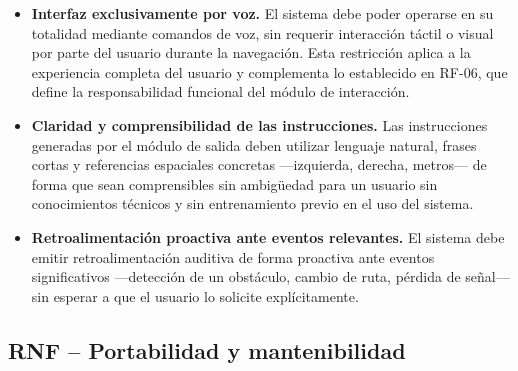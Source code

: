 \begin{itemize}

    \item[\textbf{RNF-10}] \textbf{Interfaz exclusivamente por voz.}
    El sistema debe poder operarse en su totalidad mediante comandos de voz, sin requerir
    interacción táctil o visual por parte del usuario durante la navegación. Esta restricción
    aplica a la experiencia completa del usuario y complementa lo establecido en RF-06,
    que define la responsabilidad funcional del módulo de interacción.

    \item[\textbf{RNF-11}] \textbf{Claridad y comprensibilidad de las instrucciones.}
    Las instrucciones generadas por el módulo de salida deben utilizar lenguaje natural,
    frases cortas y referencias espaciales concretas ---izquierda, derecha, metros--- de
    forma que sean comprensibles sin ambigüedad para un usuario sin conocimientos técnicos
    y sin entrenamiento previo en el uso del sistema.

    \item[\textbf{RNF-12}] \textbf{Retroalimentación proactiva ante eventos relevantes.}
    El sistema debe emitir retroalimentación auditiva de forma proactiva ante eventos
    significativos ---detección de un obstáculo, cambio de ruta, pérdida de señal--- sin
    esperar a que el usuario lo solicite explícitamente.

\end{itemize}

\subsection*{RNF -- Portabilidad y mantenibilidad}

